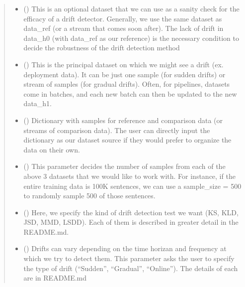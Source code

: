 \documentclass[letterpaper,10pt,english]{sphinxmanual}
\begin{document}
\begin{fulllineitems}
\begin{fulllineitems}
\begin{quote}
\begin{description}
\begin{itemize}
\item {} 
\sphinxAtStartPar
{} (\sphinxstyleliteralemphasis{\sphinxupquote{, }}) \textendash{} This is an optional dataset that we can use as a sanity check for the efficacy of a drift
detector. Generally, we use the same dataset as data\_ref (or a stream that comes soon after).
The lack of drift in data\_h0 (with data\_ref as our reference) is the necessary
condition to decide the robustness of the drift detection method

\item {} 
\sphinxAtStartPar
{} (\sphinxstyleliteralemphasis{\sphinxupquote{, }}) \textendash{} This is the principal dataset on which we might see a drift (ex. deployment data).
It can be just one sample (for sudden drifts) or stream of samples (for gradual drifts).
Often, for pipelines, datasets come in batches, and each new batch can then be updated
to the new data\_h1.

\item {} 
\sphinxAtStartPar
{} () \textendash{} Dictionary with samples for reference and comparison data (or streams of comparison data).
The user can directly input the dictionary as our dataset source if they would prefer to
organize the data on their own.

\item {} 
\sphinxAtStartPar
{} () \textendash{} This parameter decides the number of samples from each of the above 3 datasets that we would
like to work with. For instance, if the entire training data is 100K sentences, we can use
a sample\_size = 500 to randomly sample 500 of those sentences.

\item {} 
\sphinxAtStartPar
{} () \textendash{} Here, we specify the kind of drift detection test we want (KS, KLD, JSD, MMD, LSDD).
Each of them is described in greater detail in the README.md.

\item {} 
\sphinxAtStartPar
{} () \textendash{} Drifts can vary depending on the time horizan and frequency at which we try to detect
them. This parameter asks the user to specify the type of drift (“Sudden”, “Gradual”,
“Online”). The details of each are in README.md


\end{itemize}
\end{description}
\end{quote}
\end{fulllineitems}
\end{fulllineitems}
\end{document}
